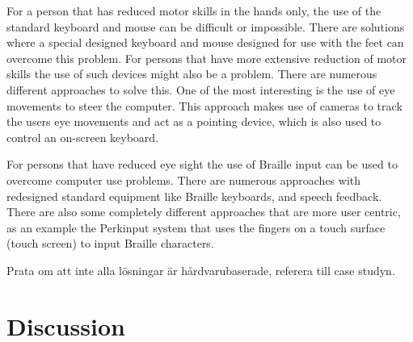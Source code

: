
For a person that has reduced motor skills in the hands only, the use of the standard keyboard and mouse can be difficult or impossible. There are solutions where a special designed keyboard and mouse designed for use with the feet can overcome this problem.
For persons that have more extensive reduction of motor skills the use of such devices might also be a problem. There are numerous different approaches to solve this. One of the most interesting is the use of eye movements to steer the computer. This approach makes use of cameras to track the users eye movements and act as a pointing device, which is also used to control an on-screen keyboard. 

For persons that have reduced eye sight the use of Braille input can be used to overcome computer use problems. There are numerous approaches with redesigned standard equipment like Braille keyboards, and speech feedback. There are also some completely different approaches that are more user centric, as an example the Perkinput system that uses the fingers on a touch surface (touch screen) to input Braille characters.

Prata om att inte alla lösningar är hårdvarubaserade, referera till case studyn.

\section{Discussion}

